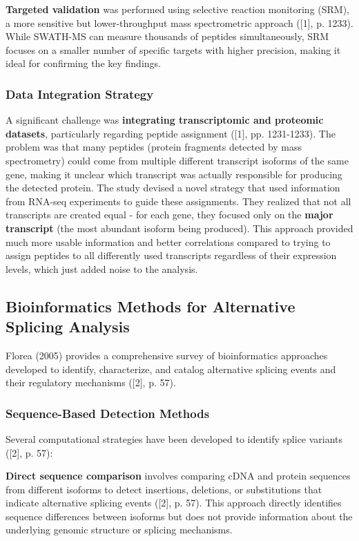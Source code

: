 \documentclass[12pt,a4paper]{article}
\begin{document}
\textbf{Targeted validation} was performed using selective reaction monitoring (SRM), a more sensitive but lower-throughput mass spectrometric approach ([1], p. 1233). While SWATH-MS can measure thousands of peptides simultaneously, SRM focuses on a smaller number of specific targets with higher precision, making it ideal for confirming the key findings.

\subsubsection{Data Integration Strategy}

A significant challenge was \textbf{integrating transcriptomic and proteomic datasets}, particularly regarding peptide assignment ([1], pp. 1231-1233). The problem was that many peptides (protein fragments detected by mass spectrometry) could come from multiple different transcript isoforms of the same gene, making it unclear which transcript was actually responsible for producing the detected protein. The study devised a novel strategy that used information from RNA-seq experiments to guide these assignments. They realized that not all transcripts are created equal - for each gene, they focused only on the \textbf{major transcript} (the most abundant isoform being produced). This approach provided much more usable information and better correlations compared to trying to assign peptides to all differently used transcripts regardless of their expression levels, which just added noise to the analysis.

\subsection{Bioinformatics Methods for Alternative Splicing Analysis}

Florea (2005) provides a comprehensive survey of bioinformatics approaches developed to identify, characterize, and catalog alternative splicing events and their regulatory mechanisms ([2], p. 57).

\subsubsection{Sequence-Based Detection Methods}

Several computational strategies have been developed to identify splice variants ([2], p. 57):

\textbf{Direct sequence comparison} involves comparing cDNA and protein sequences from different isoforms to detect insertions, deletions, or substitutions that indicate alternative splicing events ([2], p. 57). This approach directly identifies sequence differences between isoforms but does not provide information about the underlying genomic structure or splicing mechanisms.
\end{document}
